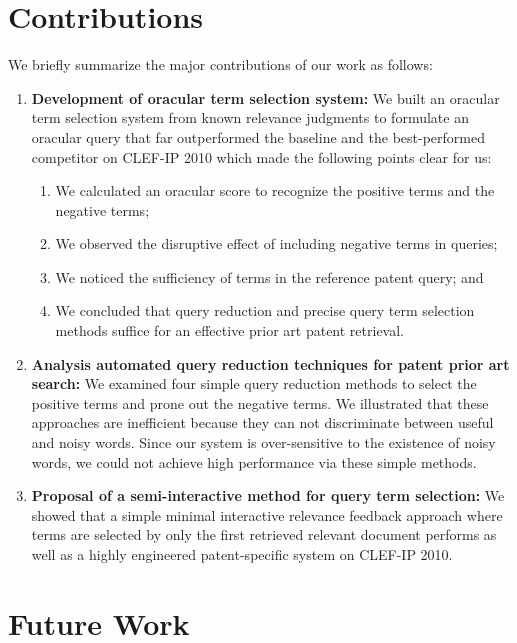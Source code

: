 \section{Contributions}
\label{sec:contributions}
We briefly summarize the major contributions of our work as follows:
\begin{enumerate}
\item \textbf{Development of oracular term selection system: }We built an oracular term selection system from known relevance judgments to formulate an oracular query that far outperformed the baseline and the best-performed competitor on CLEF-IP 2010 which made the following points clear for us:
\begin{enumerate}
\item We calculated an oracular score to recognize the positive terms and the negative terms;
\item We observed the disruptive effect of including negative terms in queries;
\item We noticed the sufficiency of terms in the reference patent query; and 
\item We concluded that query reduction and precise query term selection methods suffice for an effective prior art patent retrieval.
\end{enumerate}
\item \textbf{Analysis automated query reduction techniques for patent prior art search: } We examined four simple query reduction methods to select the positive terms and prone out the negative terms. We illustrated that these approaches are inefficient because they can not discriminate between useful and noisy words. Since our system is over-sensitive to the existence of noisy words, we could not achieve high performance via these simple methods. 
\item \textbf{Proposal of a semi-interactive method for query term selection: }We showed that a simple minimal interactive relevance feedback approach where terms are selected by only the first retrieved relevant document performs as well as a highly engineered patent-specific system on CLEF-IP 2010. 
\end{enumerate}

\section{Future Work}
\label{sec:future}




